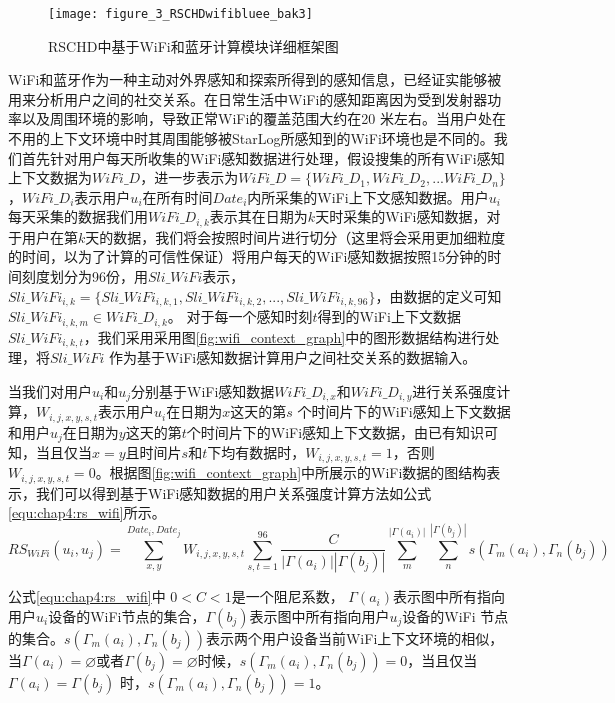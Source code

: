 \begin{figure}[htp]
\centering
\texttt{[image: figure\_3\_RSCHDwifibluee\_bak3]}
\caption{RSCHD中基于WiFi和蓝牙计算模块详细框架图}
\label{fig:7_1_wifi}
\end{figure}
\par WiFi和蓝牙作为一种主动对外界感知和探索所得到的感知信息，已经证实能够被用来分析用户之间的社交关系。在日常生活中WiFi的感知距离因为受到发射器功率以及周围环境的影响，导致正常WiFi的覆盖范围大约在20 米左右。当用户处在不用的上下文环境中时其周围能够被StarLog所感知到的WiFi环境也是不同的。我们首先针对用户每天所收集的WiFi感知数据进行处理，假设搜集的所有WiFi感知上下文数据为$WiFi\_D$，进一步表示为$WiFi\_D=\{  WiFi\_D_{1},WiFi\_D_{2},...WiFi\_D_{n}  \}$，$WiFi\_D_{i}$表示用户$u_{i}$在所有时间$Date_{i}$内所采集的WiFi上下文感知数据。用户$u_{i}$每天采集的数据我们用$WiFi\_D_{i,k}$表示其在日期为$k$天时采集的WiFi感知数据，对于用户在第$k$天的数据，我们将会按照时间片进行切分（这里将会采用更加细粒度的时间，以为了计算的可信性保证）将用户每天的WiFi感知数据按照15分钟的时间刻度划分为96份，用$Sli\_WiFi$表示，$Sli\_WiFi_{i,k}=\{Sli\_WiFi_{i,k,1},Sli\_WiFi_{i,k,2},...,Sli\_WiFi_{i,k,96}\}$，由数据的定义可知$Sli\_WiFi_{i,k,m} \in WiFi\_D_{i,k}$。 对于每一个感知时刻$t$得到的WiFi上下文数据$Sli\_WiFi_{i,k,t}$，我们采用采用图\ref{fig:wifi_context_graph}中的图形数据结构进行处理，将$Sli\_WiFi$ 作为基于WiFi感知数据计算用户之间社交关系的数据输入。

\par 当我们对用户$u_{i}$和$u_{j}$分别基于WiFi感知数据$WiFi\_D_{i,x}$和$WiFi\_D_{i,y}$进行关系强度计算，$W_{i,j,x,y,s,t}$表示用户$u_{i}$在日期为$x$这天的第$s$ 个时间片下的WiFi感知上下文数据和用户$u_{j}$在日期为$y$这天的第$t$个时间片下的WiFi感知上下文数据，由已有知识可知，当且仅当$x=y$且时间片$s$和$t$下均有数据时，$W_{i,j,x,y,s,t}=1$，否则$W_{i,j,x,y,s,t}=0$。根据图\ref{fig:wifi_context_graph}中所展示的WiFi数据的图结构表示，我们可以得到基于WiFi感知数据的用户关系强度计算方法如公式\ref{equ:chap4:rs_wifi}所示。
\begin{equation}
\label{equ:chap4:rs_wifi}
RS_{WiFi}(u_{i},u_{j})=\sum_{x ,y }^{ Date_{i}, Date_{j}}W_{i,j,x,y,s,t}\sum_{s,t=1}^{96} \frac{C}{ \left |\Gamma (a_{i})  \right |\left |\Gamma (b_{j})  \right | } \sum_{m}^{\left |\Gamma (a_{i})  \right |}  \sum_{n}^{\left |\Gamma (b_{j})  \right |}s(\Gamma_{m} (a_{i}),\Gamma_{n} (b_{j}))
\end{equation}
\par 公式\ref{equ:chap4:rs_wifi}中  $0< C<1$是一个阻尼系数， $\Gamma (a_{i}) $表示图中所有指向用户$u_{i}$设备的WiFi节点的集合，$\Gamma (b_{j}) $表示图中所有指向用户$u_{j}$设备的WiFi 节点的集合。$s(\Gamma_{m} (a_{i}),\Gamma_{n} (b_{j}))$表示两个用户设备当前WiFi上下文环境的相似，当$\Gamma (a_{i})= \varnothing  $或者$\Gamma (b_{j})=\varnothing $时候，$s(\Gamma_{m} (a_{i}),\Gamma_{n} (b_{j}))=0$，当且仅当$\Gamma (a_{i})=\Gamma (b_{j})$ 时，$s(\Gamma_{m} (a_{i}),\Gamma_{n} (b_{j}))=1$。

